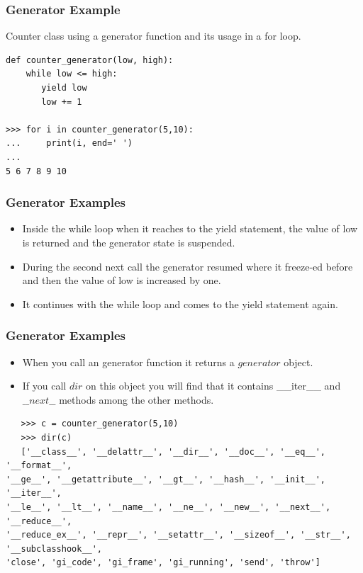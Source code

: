 \begin{frame}[fragile]\frametitle{Generator Example}
Counter class using a generator function and its usage in a for loop.
\begin{lstlisting}
def counter_generator(low, high):
    while low <= high:
       yield low
       low += 1

>>> for i in counter_generator(5,10):
...     print(i, end=' ')
...
5 6 7 8 9 10
\end{lstlisting}
\end{frame}

\begin{frame}[fragile]\frametitle{Generator Examples}
    \begin{itemize}
    \item  Inside the while loop when it reaches to the yield statement, the value of low is returned and the generator state is suspended. 
    \item During the second next call the generator resumed where it freeze-ed before and then the value of low is increased by one. 
    \item It continues with the while loop and comes to the yield statement again.
    \end{itemize}
\end{frame}

\begin{frame}[fragile]\frametitle{Generator Examples}
    \begin{itemize}
    \item  When you call an generator function it returns a $generator$ object.
    \item If you call $dir$ on this object you will find that it contains \_\_iter\_\_ and $\_\_next\_\_$ methods among the other methods.
    \end{itemize}
    \begin{lstlisting}
   >>> c = counter_generator(5,10)
   >>> dir(c)
   ['__class__', '__delattr__', '__dir__', '__doc__', '__eq__', '__format__',
'__ge__', '__getattribute__', '__gt__', '__hash__', '__init__', '__iter__',
'__le__', '__lt__', '__name__', '__ne__', '__new__', '__next__', '__reduce__',
'__reduce_ex__', '__repr__', '__setattr__', '__sizeof__', '__str__', '__subclasshook__',
'close', 'gi_code', 'gi_frame', 'gi_running', 'send', 'throw']
\end{lstlisting}
\end{frame}


